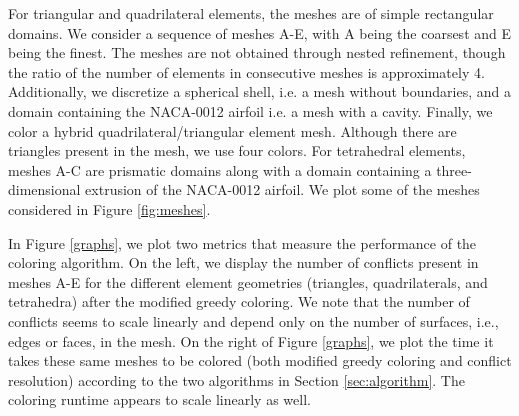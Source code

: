 \documentclass[12pt]{article}
\begin{document}
For triangular and quadrilateral elements, the meshes are of simple rectangular domains.  We consider a sequence of meshes A-E, with A being the coarsest and E being the finest.  The meshes are not obtained through nested refinement, though the ratio of the number of elements in consecutive meshes is approximately 4.  Additionally, we discretize a spherical shell, i.e. a mesh without boundaries, and a domain containing the NACA-0012 airfoil i.e. a mesh with a cavity.  Finally, we color a hybrid quadrilateral/triangular element mesh.  Although there are triangles present in the mesh, we use four colors.  For tetrahedral elements, meshes A-C are prismatic domains along with a domain containing a three-dimensional extrusion of the NACA-0012 airfoil.  We plot some of the meshes considered in Figure \ref{fig:meshes}.

In Figure \ref{graphs}, we plot two metrics that measure the performance of the coloring algorithm.   On the left, we display the number of conflicts present in meshes A-E for the different element geometries (triangles, quadrilaterals, and tetrahedra) after the modified greedy coloring.  We note that the number of conflicts seems to scale linearly and depend only on the number of surfaces, i.e., edges or faces, in the mesh.  On the right of Figure  \ref{graphs}, we plot the time it takes these same meshes to be colored (both modified greedy coloring and conflict resolution) according to the two algorithms in Section \ref{sec:algorithm}.  The coloring runtime appears to scale linearly as well.
\end{document}
